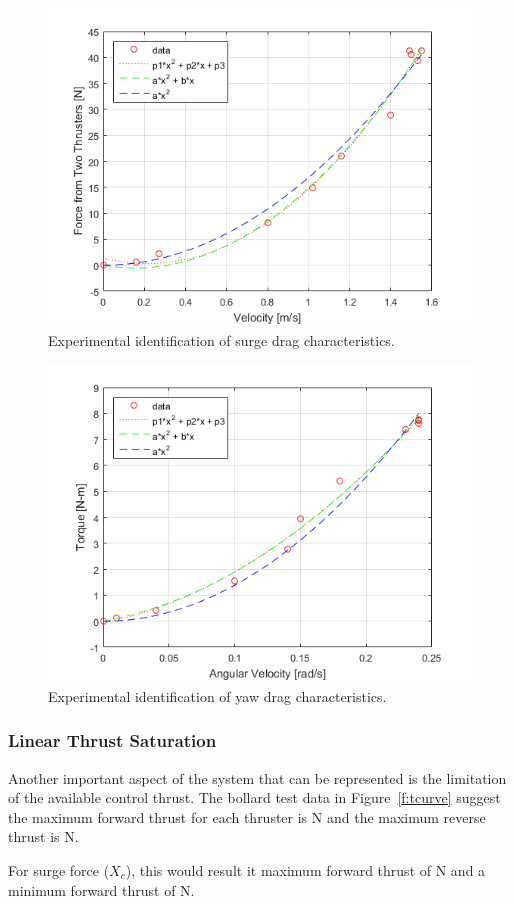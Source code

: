 \documentclass[11pt,draftcls,journal,onecolumn]{IEEEtran}
\begin{document}
\begin{figure}[htbp]
\centering
\includegraphics[width=0.75\linewidth]{quad_drag_surge.png}
\caption{Experimental identification of surge drag characteristics.}
\label{f:drag_surge}
\end{figure}

\begin{figure}[htbp]
\centering
\includegraphics[width=0.75\linewidth]{quad_drag_yaw.png}
\caption{Experimental identification of yaw drag characteristics.}
\label{f:drag_yaw}
\end{figure}

\subsubsection{Linear Thrust Saturation}
Another important aspect of the system that can be represented is the limitation of the available control thrust. The bollard test data in Figure~\ref{f:tcurve} suggest the maximum forward thrust for each thruster is \unit[20]{N} and the maximum reverse thrust is \unit[-12]{N}.  

For surge force ($X_c$), this would result it maximum forward thrust of \unit[40]{N} and a minimum forward thrust of \unit[-12]{N}.
\end{document}
